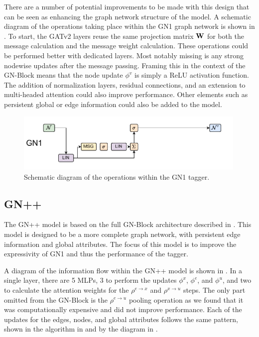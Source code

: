 There are a number of potential improvements to be made with this design that can be seen as enhancing the graph network structure of the model.
A schematic diagram of the operations taking place within the GN1 graph network is shown in .
To start, the GATv2 layers reuse the same projection matrix $\mathbf{W}$ for both the message calculation and the message weight calculation.
These operations could be performed better with dedicated layers.
Most notably missing is any strong nodewise updates after the message passing.
Framing this in the context of the GN-Block means that the node update $\phi^v$ is simply a ReLU activation function.
The addition of normalization layers, residual connections, and an extension to multi-headed attention could also improve performance.
Other elements such as persistent global or edge information could also be added to the model.

\begin{figure}
    \centering
    \includegraphics[width=0.99\textwidth]{figures/flavour_tagging/gn1.pdf}
    \caption{Schematic diagram of the operations within the GN1 tagger.}
    \label{fig:gn1_graph}
\end{figure}

\subsection{GN++}

The GN++ model is based on the full GN-Block architecture described in .
This model is designed to be a more complete graph network, with persistent edge information and global attributes.
The focus of this model is to improve the expressivity of GN1 and thus the performance of the tagger.

A diagram of the information flow within the GN++ model is shown in .
In a single layer, there are 5 MLPs, 3 to perform the updates $\phi^x$, $\phi^e$, and $\phi^u$, and two to calculate the attention weights for the $\rho^{e \to x}$ and $\rho^{x \to u}$ steps.
The only part omitted from the GN-Block is the $\rho^{e \to u}$ pooling operation as we found that it was computationally expensive and did not improve performance.
Each of the updates for the edges, nodes, and global attributes follows the same pattern, shown in the algorithm in  and by the diagram in .


